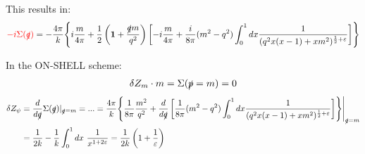 \documentclass[a4paper,11pt,DIV=12]{scrartcl}
\begin{document}
This results in: 
\begin{align*}
    \textcolor{red} {-i \Sigma(\slashed{q})}= -\frac{4 \pi}{k}\Biggl\{ i\frac{m}{4\pi} + \frac{1}{2} \left(\mathbf{1}+\frac{\slashed{q}m}{q^2}\right) \left[ -i\frac{m}{4 \pi} + \frac{i}{8 \pi} (m^2 - q^2)\int_0^1 dx \frac{1}{(q^2 x(x-1)+xm^2)^{\frac{1}{2}+\varepsilon}}  \right] \Biggr\}
\end{align*}


In the ON-SHELL scheme:
\begin{align*}
    \delta Z_m \cdot m = \Sigma(\slashed{p}=m) = 0
\end{align*}
\begin{align*}
    \delta Z_\psi &= \frac{d}{d \slashed{q}}\Sigma(\slashed{q})|_{\slashed{q}=m} =...=\frac{4 \pi}{k}\Biggl\{ \frac{1}{8\pi}\frac{m^2}{q^2} + \frac{d}{d\slashed{q}}\left[ \frac{1}{8 \pi} (m^2-q^2) \int_0^1 dx \frac{1}{(q^2 x (x-1)+xm^2)^{\frac{1}{2}+\varepsilon}}  \right]  \Biggr\}\Bigg| _{\slashed{q}=m}
    \\ &=\frac{1}{2k} -\frac{1}{k} \int_0^1 dx\  \frac{1}{x^{1+2\varepsilon}}=\frac{1}{2k}\left(1+\frac{1}{\varepsilon}\right)
\end{align*}


% 
% 
\end{document}
